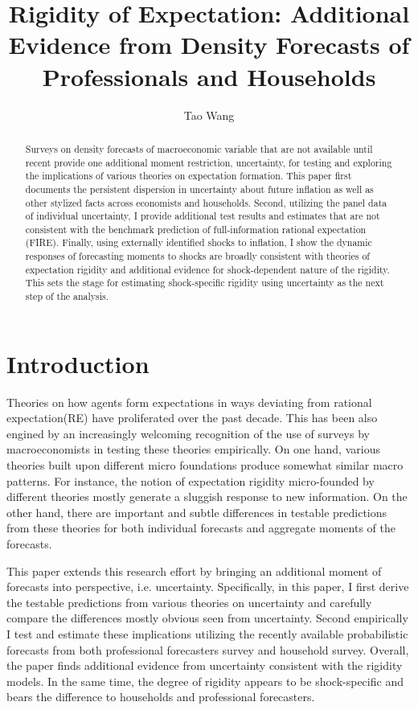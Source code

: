 \documentclass[]{article}
\title{Rigidity of Expectation: Additional Evidence from Density Forecasts of Professionals and Households}
\author{Tao Wang}
\begin{document}
	
	\maketitle
	
	\begin{abstract}
		Surveys on density forecasts of macroeconomic variable that are not available until recent provide one additional moment restriction, uncertainty, for testing and exploring the implications of various theories on expectation formation. This paper first documents the persistent dispersion in uncertainty about future inflation as well as other stylized facts across economists and households.  Second,  utilizing the panel data of individual uncertainty, I provide additional test results and estimates that are not consistent with the benchmark prediction of full-information rational expectation (FIRE). Finally, using externally identified shocks to inflation, I show the dynamic responses of forecasting moments to shocks are broadly consistent with theories of expectation rigidity and additional evidence for shock-dependent nature of the rigidity.  This sets the stage for estimating shock-specific rigidity using uncertainty as the next step of the analysis.  
		
	\end{abstract}
	
	\newpage 
	
	\section{Introduction}
	
	
	Theories on how agents form expectations in ways deviating from rational expectation(RE) have proliferated over the past decade. This has been also engined by an increasingly welcoming recognition of the use of surveys by macroeconomists in testing these theories empirically.  On one hand, various theories built upon different micro foundations produce somewhat similar macro patterns. For instance, the notion of expectation rigidity micro-founded by different theories mostly generate a sluggish response to new information.  On the other hand, there are important and subtle differences in testable predictions from these theories for both individual forecasts and aggregate moments of the forecasts. 
	
	This paper extends this research effort by bringing an additional moment of forecasts into perspective, i.e. uncertainty. Specifically, in this paper, I first derive the testable predictions from various theories on uncertainty and carefully compare the differences mostly obvious seen from uncertainty. Second empirically I test and estimate these implications utilizing the recently available probabilistic forecasts from both professional forecasters survey and household survey. Overall, the paper finds additional evidence from uncertainty consistent with the rigidity models. In the same time, the degree of rigidity appears to be shock-specific and bears the difference to households and professional forecasters. 
	
\end{document}
